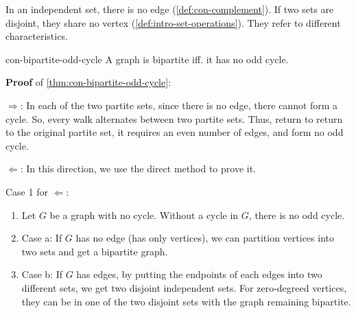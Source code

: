 \documentclass[../src/handouts/main.tex]{subfiles}
\begin{document}
In an independent set, there is no edge (\cref{def:con-complement}). If two sets are disjoint, they share no vertex (\cref{def:intro-set-operations}). They refer to different characteristics.

\begin{theorem}{}{con-bipartite-odd-cycle}
  A graph is bipartite iff. it has no odd cycle.
\end{theorem}

\textbf{Proof} of \cref{thm:con-bipartite-odd-cycle}:

$\Rightarrow$: In each of the two partite sets, since there is no edge, there cannot form a cycle. So, every walk alternates between two partite sets. Thus, return to return to the original partite set, it requires an even number of edges, and form no odd cycle.

$\Leftarrow$: In this direction, we use the direct method to prove it.

Case 1 for $\Leftarrow$:
\begin{enumerate}
  \item Let $G$ be a graph with no cycle. Without a cycle in $G$, there is no odd cycle.
  \item Case a: If $G$ has no edge (has only vertices), we can partition vertices into two sets and get a bipartite graph.
  \item Case b: If $G$ has edges, by putting the endpoints of each edges into two different sets, we get two disjoint independent sets. For zero-degreed vertices, they can be in one of the two disjoint sets with the graph remaining bipartite.
\end{enumerate}
\end{document}
